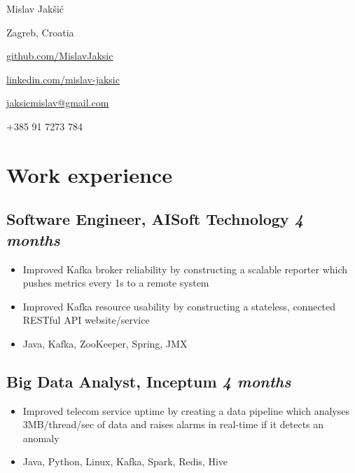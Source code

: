 \documentclass[a4paper]{article}
\newcommand{\bolditalicpair}
[2]
{\textbf{#1} \texorpdfstring{\hfill}{} \textit{#2}}
\begin{document}
\begin{multicols}{2}

\noindent
\begin{minipage}{.49\textwidth}
\raggedright

{\huge Mislav Jakšić}

Zagreb, Croatia
\end{minipage}

\noindent
\begin{minipage}{.49\textwidth}
\raggedleft

\href{https://github.com/MislavJaksic}{github.com/MislavJaksic}

\href{https://www.linkedin.com/in/mislav-jaksic}{linkedin.com/mislav-jaksic}

\href{mailto:jaksicmislav@gmail.com}{jaksicmislav@gmail.com}

+385 91 7273 784

\end{minipage}

\end{multicols}



\section{Work experience}
\subsection{\bolditalicpair{Software Engineer, AISoft Technology}{4 months}}

\begin{itemize}
  \item Improved Kafka broker reliability by constructing a scalable reporter which pushes metrics every 1s to a remote system
  \item Improved Kafka resource usability by constructing a stateless, connected RESTful API website/service
  \item Java, Kafka, ZooKeeper, Spring, JMX
\end{itemize}

\subsection{\bolditalicpair{Big Data Analyst, Inceptum}{4 months}}

\begin{itemize}
  \item Improved telecom service uptime by creating a data pipeline which analyses 3MB/thread/sec of data and raises alarms in real-time if it detects an anomaly
  \item Java, Python, Linux, Kafka, Spark, Redis, Hive
\end{itemize}
\end{document}
